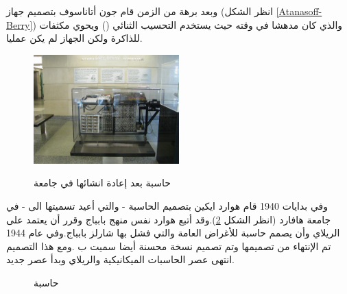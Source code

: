 \documentclass[document.tex]{subfiles}
\begin{document}
وبعد برهة من الزمن قام جون أتاناسوف  بتصميم جهاز (انظر الشكل \ref{Atanasoff-Berry}) والذي كان مدهشا في وقته حيث يستخدم التحسيب الثنائي () ويحوي مكثفات للذاكرة ولكن الجهاز لم يكن عمليا.
\begin{figure}[h!] 
  \caption{حاسبة  بعد إعادة انشائها في جامعة }
  \centering
   \includegraphics[width=0.5\textwidth]{../img/Atanasoff-Berry}
 \label{fig:Atanasoff-Berry} 
\end{figure}
وفي بدايات 1940 قام هوارد ايكين  بتصميم الحاسبة  - والتي أعيد تسميتها الى  - في جامعة هافارد (انظر الشكل \ref{fig:HarvardMarkI}).وقد أتبع هوارد نفس منهج بابباج وقرر أن يعتمد على الريلاي وأن يصمم حاسبة للأغراض العامة والتي فشل بها شارلز بابباج.وفي عام 1944 تم الإنتهاء من تصميمها وتم تصميم نسخة محسنة أيضا سميت ب .ومع هذا التصميم انتهى عصر الحاسبات الميكانيكية والريلاي وبدأ عصر جديد.
 
\begin{figure}
  \centering
  \caption{حاسبة }
  \label{fig:HarvardMarkI}
\end{figure}
\end{document}
